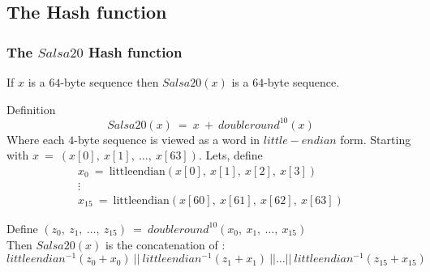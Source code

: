 \subsection{The Hash function}
\begin{frame}
\frametitle{The $Salsa20$ Hash function}

If $x$ is a $64$-byte sequence then $Salsa20(x)$ is a $64$-byte sequence. 
\begin{block}{Definition}
$$Salsa20(x) \ = \ x \ + \ doubleround^{10}(x)$$ 
Where each $4$-byte sequence is viewed as a word in $little-endian$ form. 
Starting with $x \ = \ (x[0], \ x[1], \ \ldots, \ x[63])$. Lets, define
\vspace{-8pt}
\[
\begin{gathered}
x_0 \ = \ \text{littleendian}(x[0], \ x[1], \ x[2], \ x[3]) \\
\vdots \\
x_{15} \ = \ \text{littleendian}(x[60], \ x[61], \ x[62], \ x[63])
\end{gathered}
\]
\end{block}
\begin{exampleblock}{}
Define $(z_0, \ z_1, \ \ldots, \ z_{15}) \ = \ doubleround^{10}(x_0, \ x_1, \ \ldots, \ x_{15})$ \\ Then $Salsa20(x)$ is the concatenation of : 
\footnotesize{$$littleendian^{-1}(z_0 + x_0) \ || \ littleendian^{-1}(z_1 + x_1) \ || \ldots || \ littleendian^{-1}(z_{15} + x_{15})$$}
\end{exampleblock}
\end{frame}